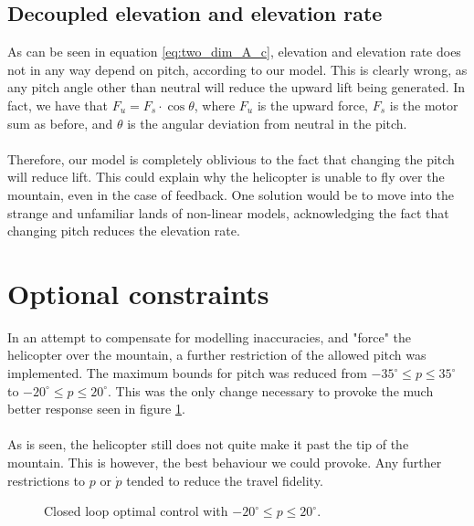 \subsection{Decoupled elevation and elevation rate}\label{sec:decouple_discussion}
As can be seen in equation \ref{eq:two_dim_A_c}, elevation and elevation rate does not in any way depend on pitch, according to our model. This is clearly wrong, as any pitch angle other than neutral will reduce the upward lift being generated. In fact, we have that $F_u = F_s\cdot\cos\theta$, where $F_u$ is the upward force, $F_s$ is the motor sum as before, and $\theta$ is the angular deviation from neutral in the pitch.\\
\\
Therefore, our model is completely oblivious to the fact that changing the pitch will reduce lift. This could explain why the helicopter is unable to fly over the mountain, even in the case of feedback. One solution would be to move into the strange and unfamiliar lands of non-linear models, acknowledging the fact that changing pitch reduces the elevation rate.

\section{Optional constraints}\label{sec:optional_constraints}
In an attempt to compensate for modelling inaccuracies, and "force" the helicopter over the mountain, a further restriction of the allowed pitch was implemented. The maximum bounds for pitch was reduced from $-35^\circ\leq p\leq 35^\circ$ to $-20^\circ\leq p\leq 20^\circ$. This was the only change necessary to provoke the much better response seen in figure \ref{fig:closed_loop_restricted}.\\
\\
As is seen, the helicopter still does not quite make it past the tip of the mountain. This is however, the best behaviour we could provoke. Any further restrictions to $p$ or $\dot{p}$ tended to reduce the travel fidelity.
\begin{figure}
        \centering
        \setlength{\figureheight}{6cm}
        \setlength{\figurewidth}{10cm}
        
        \caption{Closed loop optimal control with $-20^\circ\leq p\leq 20^\circ$.} 
\label{fig:closed_loop_restricted} 
\end{figure}